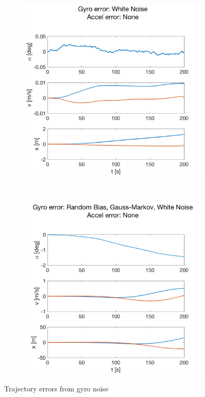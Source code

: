 \documentclass{article}
\begin{document}
\begin{figure}[H]
\begin{subfigure}[t]{0.49\textwidth}
    \end{subfigure}
    ~
    \begin{subfigure}[t]{0.49\textwidth}
        \centering
        \includegraphics[width=\textwidth]{fig/gyro_wn}
    \end{subfigure}
    ~
    \begin{subfigure}[t]{0.49\textwidth}
        \centering
        \includegraphics[width=\textwidth]{fig/gyro_all}
    \end{subfigure}
    \caption{Trajectory errors from gyro noise}
    \label{fig:error_gyro}
\end{figure}
\end{document}

